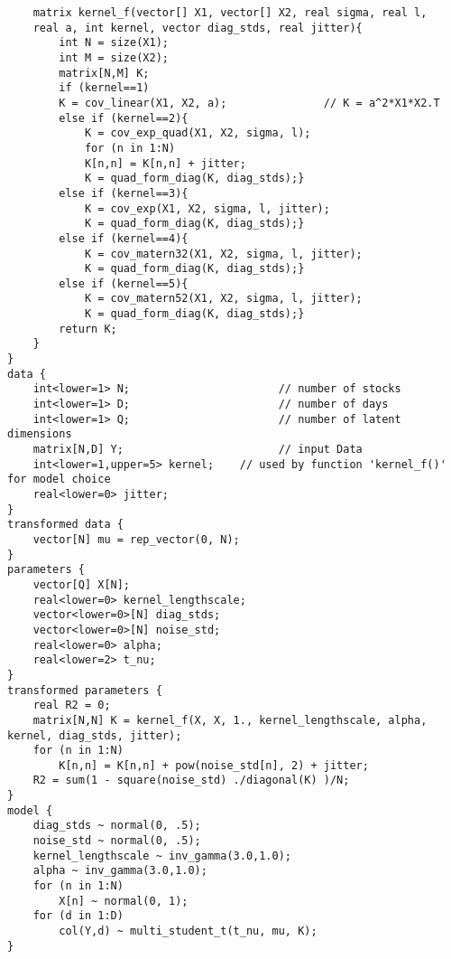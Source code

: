 \begin{lstlisting}
	matrix kernel_f(vector[] X1, vector[] X2, real sigma, real l, 
	real a, int kernel, vector diag_stds, real jitter){
		int N = size(X1);
		int M = size(X2);
		matrix[N,M] K;
		if (kernel==1)
		K = cov_linear(X1, X2, a);               // K = a^2*X1*X2.T
		else if (kernel==2){
			K = cov_exp_quad(X1, X2, sigma, l);
			for (n in 1:N)
			K[n,n] = K[n,n] + jitter;
			K = quad_form_diag(K, diag_stds);}
		else if (kernel==3){
			K = cov_exp(X1, X2, sigma, l, jitter);
			K = quad_form_diag(K, diag_stds);}
		else if (kernel==4){
			K = cov_matern32(X1, X2, sigma, l, jitter);
			K = quad_form_diag(K, diag_stds);}
		else if (kernel==5){
			K = cov_matern52(X1, X2, sigma, l, jitter);
			K = quad_form_diag(K, diag_stds);}
		return K;
	}
}
data {
	int<lower=1> N;                       // number of stocks
	int<lower=1> D;                       // number of days
	int<lower=1> Q;                       // number of latent dimensions
	matrix[N,D] Y;                        // input Data
	int<lower=1,upper=5> kernel;    // used by function 'kernel_f()' for model choice
	real<lower=0> jitter;
}
transformed data {
	vector[N] mu = rep_vector(0, N);      
}
parameters {
	vector[Q] X[N];                       
	real<lower=0> kernel_lengthscale;     
	vector<lower=0>[N] diag_stds;         
	vector<lower=0>[N] noise_std;         
	real<lower=0> alpha;                  
	real<lower=2> t_nu;                   
}
transformed parameters {
	real R2 = 0;
	matrix[N,N] K = kernel_f(X, X, 1., kernel_lengthscale, alpha, kernel, diag_stds, jitter);
	for (n in 1:N)
		K[n,n] = K[n,n] + pow(noise_std[n], 2) + jitter; 
	R2 = sum(1 - square(noise_std) ./diagonal(K) )/N;
}
model {
	diag_stds ~ normal(0, .5);
	noise_std ~ normal(0, .5);                 
	kernel_lengthscale ~ inv_gamma(3.0,1.0);
	alpha ~ inv_gamma(3.0,1.0);                  
	for (n in 1:N)                               
		X[n] ~ normal(0, 1);
	for (d in 1:D)                               
		col(Y,d) ~ multi_student_t(t_nu, mu, K); 
}
\end{lstlisting}
\cleardoubleoddpage

